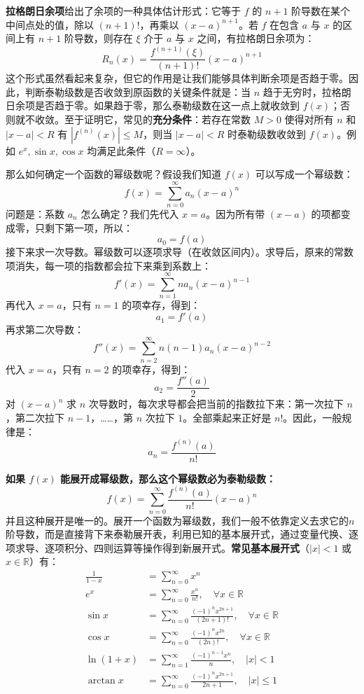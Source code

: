 \documentclass[UTF8]{ctexbook}
\begin{document}
\textbf{拉格朗日余项}给出了余项的一种具体估计形式：它等于 $f$ 的 $n+1$ 阶导数在某个中间点处的值，除以 $(n+1)!$，再乘以 $(x-a)^{n+1}$。若 $f$ 在包含 $a$ 与 $x$ 的区间上有 $n+1$ 阶导数，则存在 $\xi$ 介于 $a$ 与 $x$ 之间，有拉格朗日余项为：
\[
R_n(x) = \frac{f^{(n+1)}(\xi)}{(n+1)!} (x-a)^{n+1}
\]
这个形式虽然看起来复杂，但它的作用是让我们能够具体判断余项是否趋于零。因此，判断泰勒级数是否收敛到原函数的关键条件就是：当 $n$ 趋于无穷时，拉格朗日余项是否趋于零。如果趋于零，那么泰勒级数在这一点上就收敛到 $f(x)$；否则就不收敛。至于证明它，常见的\textbf{充分条件}：若存在常数 $M>0$ 使得对所有 $n$ 和 $|x-a|<R$ 有 $|f^{(n)}(x)| \leq M$，则当 $|x-a|<R$ 时泰勒级数收敛到 $f(x)$。例如 $e^x, \sin x, \cos x$ 均满足此条件（$R=\infty$）。


那么如何确定一个函数的幂级数呢？假设我们知道 $f(x)$ 可以写成一个幂级数：
\[
f(x) = \sum_{n=0}^{\infty} a_n (x-a)^n
\]
问题是：系数 $a_n$ 怎么确定？我们先代入 $x=a$。因为所有带 $(x-a)$ 的项都变成零，只剩下第一项，所以：
\[
a_0 = f(a)
\]
接下来求一次导数。幂级数可以逐项求导（在收敛区间内）。求导后，原来的常数项消失，每一项的指数都会拉下来乘到系数上：
\[
f'(x) = \sum_{n=1}^{\infty} n a_n (x-a)^{n-1}
\]
再代入 $x=a$，只有 $n=1$ 的项幸存，得到：
\[
a_1 = f'(a)
\]
再求第二次导数：
\[
f''(x) = \sum_{n=2}^{\infty} n(n-1) a_n (x-a)^{n-2}
\]
代入 $x=a$，只有 $n=2$ 的项幸存，得到：
\[
a_2 = \frac{f''(a)}{2}
\]
对 $(x-a)^n$ 求 $n$ 次导数时，每次求导都会把当前的指数拉下来：第一次拉下 $n$，第二次拉下 $n-1$，……，第 $n$ 次拉下 $1$。全部乘起来正好是 $n!$。因此，一般规律是：
\[
a_n = \frac{f^{(n)}(a)}{n!}
\]

\textbf{如果 $f(x)$ 能展开成幂级数，那么这个幂级数必为泰勒级数：}
\[
f(x) = \sum_{n=0}^{\infty} \frac{f^{(n)}(a)}{n!} (x-a)^n
\]
并且这种展开是唯一的。展开一个函数为幂级数，我们一般不依靠定义去求它的$n$阶导数，而是直接背下来泰勒展开表，利用已知的基本展开式，通过变量代换、逐项求导、逐项积分、四则运算等操作得到新展开式。\textbf{常见基本展开式}（$|x|<1$ 或 $x\in\mathbb{R}$）有：
\begin{align*}
\frac{1}{1-x} &= \sum_{n=0}^{\infty} x^n \\
e^x &= \sum_{n=0}^{\infty} \frac{x^n}{n!}, \quad \forall x\in\mathbb{R} \\
\sin x &= \sum_{n=0}^{\infty} \frac{(-1)^n x^{2n+1}}{(2n+1)!}, \quad \forall x\in\mathbb{R} \\
\cos x &= \sum_{n=0}^{\infty} \frac{(-1)^n x^{2n}}{(2n)!}, \quad \forall x\in\mathbb{R} \\
\ln(1+x) &= \sum_{n=1}^{\infty} \frac{(-1)^{n-1} x^n}{n}, \quad |x|<1 \\
\arctan x &= \sum_{n=0}^{\infty} \frac{(-1)^n x^{2n+1}}{2n+1}, \quad |x|\le 1
\end{align*}
\end{document}
